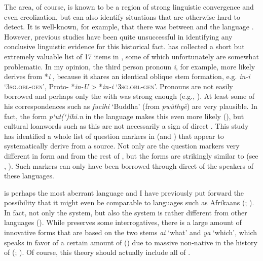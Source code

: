 The  area, of course, is known to be a region of strong linguistic convergence and even creolization, but  can also identify  situations that are otherwise hard to detect. It is well-known, for example, that there was  between  and the  language . However, previous studies have been quite unsuccessful in identifying any conclusive linguistic evidence for this historical fact. \cite[224f.]{Vovin2013b} has collected a short but extremely valuable list of 17  items in , some of which unfortunately are somewhat problematic. In my opinion, the  third person pronoun \textit{i}, for example, more likely derives from  *\textit{i} \citep[18]{Janhunen2003a}, because it shares an identical oblique stem formation, e.g.  \textit{in-i} ‘3\textsc{sg.obl}{}-\textsc{gen}’, Proto- *\textit{in-U} > *\textit{in-i} ‘3\textsc{sg.obl}{}-\textsc{gen}’. Pronouns are not easily borrowed and perhaps only the  with  was strong enough (e.g., \citealt{Doerfer1985}). At least some of his correspondences such as  \textit{fucihi} ‘Buddha’ (from  \textit{pwùthyè}) are very plausible. In fact, the form \textit{p‘ut(‘)ihi.n} in the language  makes this even more likely (\citealt{MuYejun1987}), but cultural loanwords such as this are not necessarily a sign of direct . This study has identified a whole list of question markers in  (and ) that appear to systematically derive from a  source. Not only are the  question markers very different in form and  from the rest of , but the forms are strikingly similar to  (see , ). Such markers can only have been borrowed through direct  of the speakers of these languages.

 is perhaps the most aberrant  language and I have previously put forward the possibility that it might even be comparable to languages such as Afrikaans (\citealt{Hölzl2012}; \citeyear[151]{Hölzl2015a}). In fact, not only the  system, but also the  system is rather different from other  languages (). While  preserves some  interrogatives, there is a large amount of innovative forms that are based on the two stems \textit{ai} ‘what’ and \textit{ya} ‘which’, which speaks in favor of a certain amount of  () due to massive non-native  in the history of  (\citealt{McWhorter2007}; \citealt{Operstein2015}). Of course, this theory should actually include all of .

